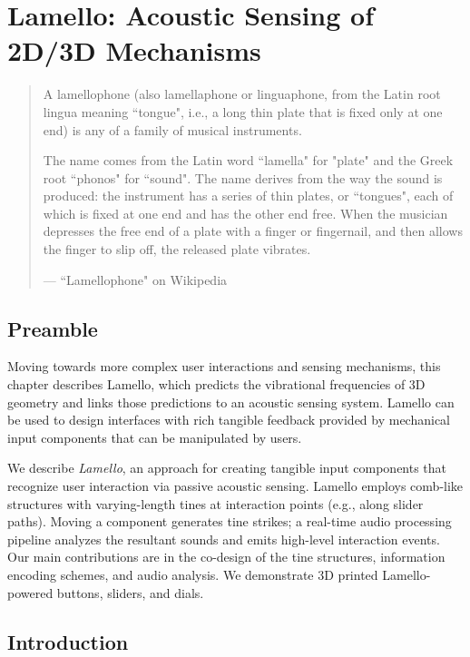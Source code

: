 \chapter{Lamello: Acoustic Sensing of 2D/3D Mechanisms}

\begin{quote}
A lamellophone (also lamellaphone or linguaphone, from the Latin root lingua meaning ``tongue", i.e., a long thin plate that is fixed only at one end) is any of a family of musical instruments.

The name comes from the Latin word ``lamella" for "plate" and the Greek root ``phonos" for ``sound". The name derives from the way the sound is produced: the instrument has a series of thin plates, or ``tongues", each of which is fixed at one end and has the other end free. When the musician depresses the free end of a plate with a finger or fingernail, and then allows the finger to slip off, the released plate vibrates.

--- ``Lamellophone" on Wikipedia
\end{quote}

\section{Preamble}
Moving towards more complex user interactions and sensing mechanisms, this chapter describes Lamello, which predicts the vibrational frequencies of 3D geometry and links those predictions to an acoustic sensing system. Lamello can be used to design interfaces with rich tangible feedback provided by mechanical input components that can be manipulated by users.

We describe \emph{Lamello}, an approach for creating tangible input components that recognize user interaction via passive acoustic sensing. Lamello employs comb-like structures with varying-length tines at interaction points (e.g., along slider paths). Moving a component generates tine strikes; a real-time audio processing pipeline analyzes the resultant sounds and emits high-level interaction events. Our main contributions are in the co-design of the tine structures, information encoding schemes, and audio analysis. We demonstrate 3D printed Lamello-powered buttons, sliders, and dials. 

\section{Introduction}

